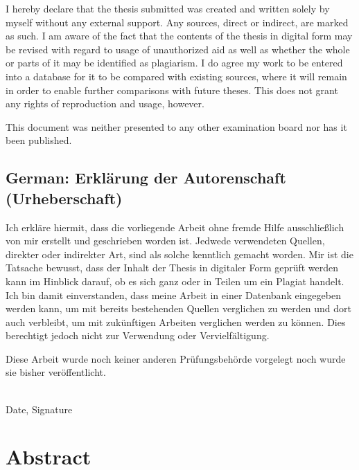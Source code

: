 \documentclass[a4paper,11pt,oneside]{article}
\begin{document}
I hereby declare that the thesis submitted was created and written
solely by myself without any external support. Any sources, direct
or indirect, are marked as such. I am aware of the fact that the
contents of the thesis in digital form may be revised with regard to
usage of unauthorized aid as well as whether the whole or parts of
it may be identified as plagiarism. I do agree my work to be entered
into a database for it to be compared with existing sources, where
it will remain in order to enable further comparisons with future
theses. This does not grant any rights of reproduction and usage,
however.

This document was neither presented to any other examination board
nor has it been published.

\subsection*{German: Erklärung der Autorenschaft (Urheberschaft)}

Ich erkläre hiermit, dass die vorliegende Arbeit ohne fremde Hilfe
ausschließlich von mir erstellt und geschrieben worden ist. Jedwede
verwendeten Quellen, direkter oder indirekter Art, sind als solche
kenntlich gemacht worden. Mir ist die Tatsache bewusst, dass der
Inhalt der Thesis in digitaler Form geprüft werden kann im Hinblick
darauf, ob es sich ganz oder in Teilen um ein Plagiat handelt. Ich
bin damit einverstanden, dass meine Arbeit in einer Datenbank
eingegeben werden kann, um mit bereits bestehenden Quellen
verglichen zu werden und dort auch verbleibt, um mit zukünftigen
Arbeiten verglichen werden zu können. Dies berechtigt jedoch nicht
zur Verwendung oder Vervielfältigung.

Diese Arbeit wurde noch keiner anderen Prüfungsbehörde vorgelegt
noch wurde sie bisher veröffentlicht.

\vspace{20mm}

\dotfill\\
Date, Signature

\newpage

\section*{Abstract}


\newpage
\tableofcontents

\clearpage
{}
\end{document}

